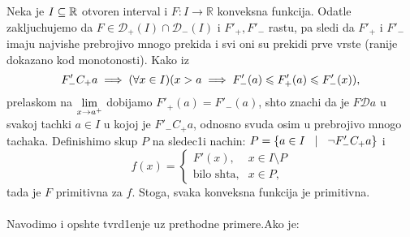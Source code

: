 \documentclass[../main.tex]{subfiles}
\begin{document}
{\pr Neka je $I\subseteq \mathbb{R}$ otvoren interval i $F:I\to\mathbb{R}$ konveksna funkcija. Odatle zakljuchujemo da $F\in \mathscr{D}_{+}(I) \cap \mathscr{D}_{-}(I)$ i $F'_{+}, F'_{-}$ rastu, pa sledi da $F'_{+}$ i $F'_{-}$ imaju najvishe prebrojivo mnogo prekida i svi oni su prekidi prve vrste (ranije dokazano kod monotonosti). Kako iz 
$$F'_{-}C_{+}a \implies (\forall x \in I) (x>a \implies F'_{-}(a)\leqslant F'_{+}(a) \leqslant F'_{-}(x)),$$
prelaskom na $\displaystyle{\lim_{x\to a^{+}}}$ dobijamo $F'_{+}(a) = F'_{-}(a)$, shto znachi da je $F \mathscr{D} a$ u svakoj tachki $a\in I$ u kojoj je $F'_{-}C_{+}a$, odnosno svuda osim u prebrojivo mnogo tachaka. Definishimo skup $P$ na sledec1i nachin: $P=\{a\in I \hspace{0.3cm} | \hspace{0.3cm} \lnot F'_{-}C_{+}a\} $ i 
$$f(x)=\begin{cases}
			F'(x), & x\in I\setminus P\\
            \textrm{bilo shta}, & x\in P,
		 \end{cases}$$
tada je $F$ primitivna za $f$. Stoga, svaka konveksna funkcija je primitivna.}\\ \\
\nap Navodimo i opshte tvrd1enje uz prethodne primere.Ako je:
\end{document}
